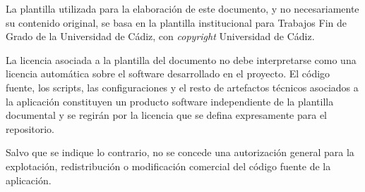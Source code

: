 
La plantilla utilizada para la elaboración de este documento, y no necesariamente su contenido original, se basa en la plantilla institucional para Trabajos Fin de Grado de la Universidad de Cádiz, con \textit{copyright} \textcopyright{} Universidad de Cádiz.

La licencia asociada a la plantilla del documento no debe interpretarse como una licencia automática sobre el software desarrollado en el proyecto. El código fuente, los scripts, las configuraciones y el resto de artefactos técnicos asociados a la aplicación constituyen un producto software independiente de la plantilla documental y se regirán por la licencia que se defina expresamente para el repositorio.

Salvo que se indique lo contrario, no se concede una autorización general para la explotación, redistribución o modificación comercial del código fuente de la aplicación.
